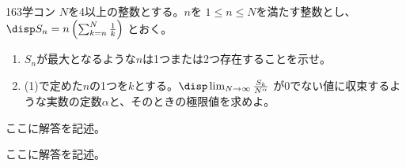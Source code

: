 \begin{thm}{163}{\maru}{学コン}
 $N$を4以上の整数とする。$n$を $1\le n \le N$を満たす整数とし、$\disp S_n=n\left(\sum_{k=n}^N \frac{1}{k}\right)$ とおく。
 \begin{enumerate}
  \item $S_n$が最大となるような$n$は1つまたは2つ存在することを示せ。
  \item (1)で定めた$n$の1つを$k$とする。$\disp \lim_{N\to\infty} \frac{S_k}{N^\alpha}$ が0でない値に収束するような実数の定数$\alpha$と、そのときの極限値を求めよ。
 \end{enumerate}
\end{thm}

ここに解答を記述。

ここに解答を記述。